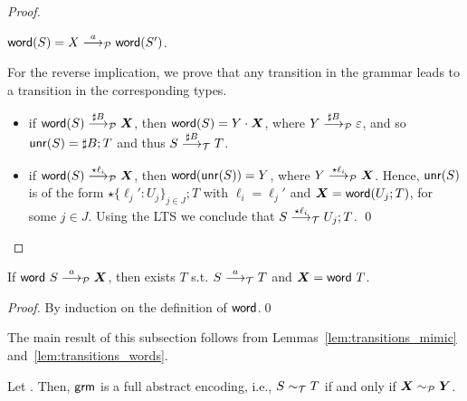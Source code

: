 \begin{proof}
\begin{itemize}
			$\word(S) = X \LTSderivesP \word(S')$. \smallskip
	\end{itemize}
	For the reverse implication, we prove that any transition in the
	grammar leads to a transition in the corresponding types.
	\begin{itemize}
		\item if $\word(S)\LTSderivesP[\sharp B] \vec X$, then
		$\word(S) = Y \cdot \vec X$, where $Y\LTSderivesP[\sharp B] \varepsilon$,
		and so $\Unravel(S) = \sharp B; T$ and thus $S\LTSderives[\sharp B] T$.
		\item if $\word(S) \LTSderivesP[\star \ell_i] \vec X $, then
		$\word(\Unravel(S)) = Y $, where $Y\LTSderivesP[\star \ell_i] \vec X$.
		Hence, $\Unravel (S)$ is of the form $\star\{\ell_j' :U_j\}_{j\in J};T$ with $\ell_i = \ell_j'$ and
		$\vec X = \word(U_j;T)$, for some $j\in J$. Using 
		the LTS we conclude that 
		$S \LTSderives[\star \ell_i] U_j ; T$. \qed
	\end{itemize}
\end{proof}

\begin{lemma}
	 \label{lem:transitions_words}
	 If $\word\ S \LTSderivesP \vec X$, then exists $T$ s.t. $S \LTSderives T$ and $\vec X = \word\ T$.
\end{lemma}
\begin{proof}
	By induction on the definition of $\word$.\qed 
\end{proof}

The main result of this subsection follows from
Lemmas~\ref{lem:transitions_mimic} and~\ref{lem:transitions_words}.

\begin{theorem}
  \label{thm:equiv_coincide}
  Let \grmcontext. Then, $\grm$ is a full abstract encoding, i.e.,
  $S \TypeEquiv T$ if and only if $\vec X \ProdEquiv \vec Y$.
\end{theorem}

